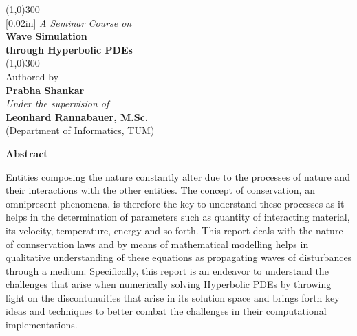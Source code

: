 \documentclass[11pt, a4paper]{report}
\begin{document}
\begin{titlepage}
    \begin{center}
    \line(1,0){300}\\
    [0.02in]
    \large{\emph {A Seminar Course on}}\\	
    \Huge{\bfseries Wave Simulation}\\
    \Huge{\bfseries through Hyperbolic PDEs}\\
    [-0.12in]
    \line(1,0){300}\\
    
    \vspace{0.35in}
    \normalsize{Authored by}\\
    
    \LARGE{\bfseries {Prabha Shankar}}\\
    
    \vspace{1.5cm}
    \normalsize{\emph {Under the supervision of}}\\
    \large{\bfseries {Leonhard Rannabauer, M.Sc.}}\\
    \small{(Department of Informatics, TUM)}\\
    
\end{center}
\end{titlepage}



\begin{titlepage}
    \begin{center}
    \bfseries{Abstract}
    \end{center}
    \vspace{0.8cm}

    Entities composing the nature constantly alter due to the processes of nature and their interactions with 
    the other entities. The concept of conservation, an omnipresent phenomena, is therefore the key to understand
    these processes as it helps in the determination of parameters such as quantity of interacting material, 
    its velocity, temperature, energy and so forth. This report deals with the nature of connservation laws and by 
    means of mathematical modelling helps in qualitative understanding of these equations as propagating 
    waves of disturbances through a medium. Specifically, this report is an endeavor to understand the challenges 
    that arise when numerically solving Hyperbolic PDEs by throwing light on the discontunuities that arise 
    in its solution space and brings forth key ideas and techniques to better combat the challenges in their 
    computational implementations. 

    \end{titlepage}
\end{document}
